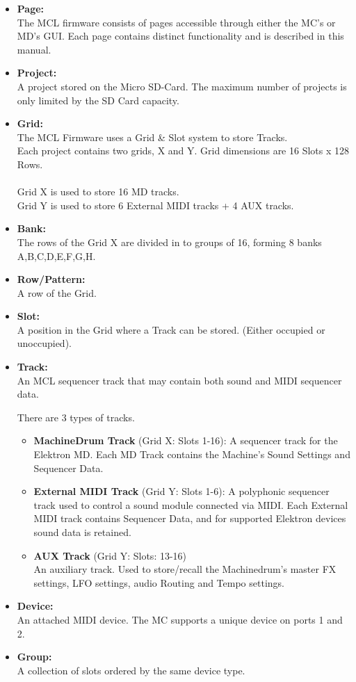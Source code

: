 \begin{itemize}
\item \textbf{Page:}
\\
The MCL firmware consists of pages accessible through either the MC's or MD's GUI. Each page contains distinct functionality and is described in this manual.
\item \textbf{Project:}
\\
A project stored on the Micro SD-Card.
The maximum number of projects is only limited by the SD Card capacity.

\item \textbf{Grid:}
\\
The MCL Firmware uses a Grid \& Slot system to store Tracks.\\
Each project contains two grids, X and Y. Grid dimensions are 16 Slots x 128 Rows.\\
\\
Grid X is used to store 16 MD tracks.\\Grid Y is used to store 6 External MIDI tracks + 4 AUX tracks.
\item \textbf{Bank:}\\
The rows of the Grid X are divided in to groups of 16, forming 8 banks A,B,C,D,E,F,G,H.
\item \textbf{Row/Pattern:}
\\
A row of the Grid.

\item \textbf{Slot:}
\\
A position in the Grid where a Track can be stored. (Either occupied or unoccupied).
\item \textbf{Track:}
\\
An MCL sequencer track that may contain both sound and MIDI sequencer data.

There are 3 types of tracks.
\begin{itemize}

\item \textbf{MachineDrum Track} (Grid X: Slots 1-16):
A sequencer track for the Elektron MD. Each MD Track contains the Machine's Sound Settings and Sequencer Data.

\item \textbf{External MIDI Track} (Grid Y: Slots 1-6):
A polyphonic sequencer track used to control a sound module connected via MIDI. Each External MIDI track contains Sequencer Data, and for supported Elektron devices sound data is retained. 

\item \textbf{AUX Track} (Grid Y: Slots: 13-16)\\
An auxiliary track. Used to store/recall the Machinedrum's master FX settings, LFO settings, audio Routing and Tempo settings.
\end{itemize}

\item \textbf{Device:}\\
An attached MIDI device. The MC supports a unique device on ports 1 and 2.

\item \textbf{Group:}
\\
A collection of slots ordered by the same device type.

\end{itemize}